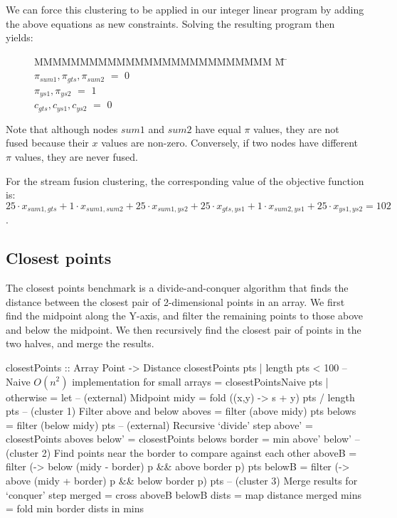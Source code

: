 We can force this clustering to be applied in our integer linear program by adding the above equations as new constraints.
Solving the resulting program then yields:

\begin{figure}[h!]
\begin{tabbing}
MMMMMMMMMMMMMMMMMMMMMMMMMM \= M \= \kill
$\pi_{sum1}, \pi_{gts }, \pi_{sum2}$
    \> $=$ \> $0$ \\
$\pi_{ys1 }, \pi_{ys2 }$
    \> $=$ \> $1$ \\
$c_{gts}, c_{ys1}, c_{ys2}$           
    \> $=$ \> $0$
\end{tabbing}
\end{figure}
Note that although nodes $sum1$ and $sum2$ have equal $\pi$ values, they are not fused because their $x$ values are non-zero.
Conversely, if two nodes have different $\pi$ values, they are never fused. 

For the stream fusion clustering, the corresponding value of the objective function is: \\
$25 \cdot x_{sum1, gts} + 1 \cdot x_{sum1,sum2} + 25 \cdot x_{sum1, ys2} + 25 \cdot x_{gts, ys1} + 1 \cdot x_{sum2, ys1} + 25 \cdot x_{ys1, ys2} = 102$. 


\subsection{Closest points}
The closest points benchmark is a divide-and-conquer algorithm that finds the distance between the closest pair of 2-dimensional points in an array.
We first find the midpoint along the Y-axis, and filter the remaining points to those above and below the midpoint.
We then recursively find the closest pair of points in the two halves, and merge the results.

\begin{haskell}[float,caption=Closest points implementation,label=figs:clustering:bench:closest-points]
closestPoints :: Array Point -> Distance
closestPoints pts
 | length pts < 100
 -- Naive $O(n^2)$ implementation for small arrays
 = closestPointsNaive pts
 | otherwise
 = let -- (external) Midpoint
       midy    = fold (\s (x,y) -> s + y) pts / length pts
       -- (cluster 1) Filter above and below
       aboves  = filter (above midy) pts
       belows  = filter (below midy) pts
       -- (external) Recursive `divide' step
       above'  = closestPoints aboves
       below'  = closestPoints belows
       border  = min above' below'
       -- (cluster 2) Find points near the border to compare against each other
       aboveB  = filter (\p -> below (midy - border) p && above border p) pts
       belowB  = filter (\p -> above (midy + border) p && below border p) pts
       -- (cluster 3) Merge results for `conquer' step
       merged  = cross aboveB belowB
       dists   = map distance merged
       mins    = fold min border dists
   in  mins
\end{haskell}

